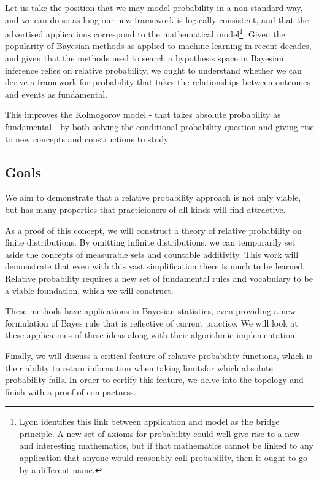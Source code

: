 \documentclass[twoside]{article}
\theoremstyle{plain}%
\theoremstyle{definition}
\theoremstyle{remark}
\begin{document}
Let us take the position that we may model probability in a non-standard way, and we can do so as long our new framework is logically consistent, and that the advertised applications correspond to the mathematical model\footnote{Lyon identifies this link between application and model as the bridge principle. A new set of axioms for probability could well give rise to a new and interesting mathematics, but if that mathematics cannot be linked to any application that anyone would reasonbly call probability, then it ought to go by a different name.}. Given the popularity of Bayesian methods as applied to machine learning in recent decades, and given that the methods used to search a hypothesis space in Bayesian inference relies on relative probability\cite{sklar_bias}, we ought to understand whether we can derive a framework for probability that takes the relationships between outcomes and events as fundamental.

This improves the Kolmogorov model - that takes absolute probability as fundamental - by both solving the conditional probability question and giving rise to new concepts and constructions to study.

\subsection{Goals}

We aim to demonstrate that a relative probability approach is not only viable, but has many properties that practicioners of all kinds will find attractive.

As a proof of this concept, we will construct a theory of relative probability on finite distributions. By omitting infinite distributions, we can temporarily set aside the concepts of measurable sets and countable additivity. This work will demonstrate that even with this vast simplification there is much to be learned. Relative probability requires a new set of fundamental rules and vocabulary to be a viable foundation, which we will construct.

These methods have applications in Bayesian statistics, even providing a new formulation of Bayes rule that is reflective of current practice. We will look at these applications of these ideas along with their algorithmic implementation.

Finally, we will discuss a critical feature of relative probability functions,
which is their ability to retain information when taking limits\textemdash for which absolute probability fails. In order to certify this feature, we delve into the topology and finish with a proof of compactness.
\end{document}
